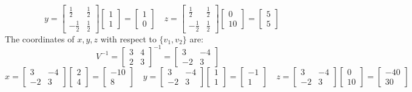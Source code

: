\documentclass{article}
\begin{document}
\begin{enumerate}[(a)]
$$    \quad
    y = \begin{bmatrix} \frac{1}{2} & \frac{1}{2} \\ -\frac{1}{2} & \frac{1}{2} \end{bmatrix} \begin{bmatrix} 1 \\ 1 \end{bmatrix}
     = \begin{bmatrix} 1 \\ 0 \end{bmatrix}
    \quad
    z = \begin{bmatrix} \frac{1}{2} & \frac{1}{2} \\ -\frac{1}{2} & \frac{1}{2} \end{bmatrix} \begin{bmatrix} 0 \\ 10 \end{bmatrix}
     = \begin{bmatrix} 5 \\ 5 \end{bmatrix}
    $$
    \newline
    The coordinates of $x, y, z$ with respect to $\{v_1, v_2\}$ are:
    $$
    V^{-1} = \begin{bmatrix} 3 & 4 \\ 2 & 3 \end{bmatrix}^{-1} = \begin{bmatrix} 3 & -4 \\ -2 & 3 \end{bmatrix}
    $$
    $$
    x = \begin{bmatrix} 3 & -4 \\ -2 & 3 \end{bmatrix} \begin{bmatrix} 2 \\ 4 \end{bmatrix}
     = \begin{bmatrix} -10 \\ 8 \end{bmatrix}
    \quad
    y = \begin{bmatrix} 3 & -4 \\ -2 & 3 \end{bmatrix} \begin{bmatrix} 1 \\ 1 \end{bmatrix}
     = \begin{bmatrix} -1 \\ 1 \end{bmatrix}
    \quad
    z = \begin{bmatrix} 3 & -4 \\ -2 & 3 \end{bmatrix} \begin{bmatrix} 0 \\ 10 \end{bmatrix}
     = \begin{bmatrix} -40 \\ 30 \end{bmatrix}
    $$


\end{enumerate}
\end{document}
